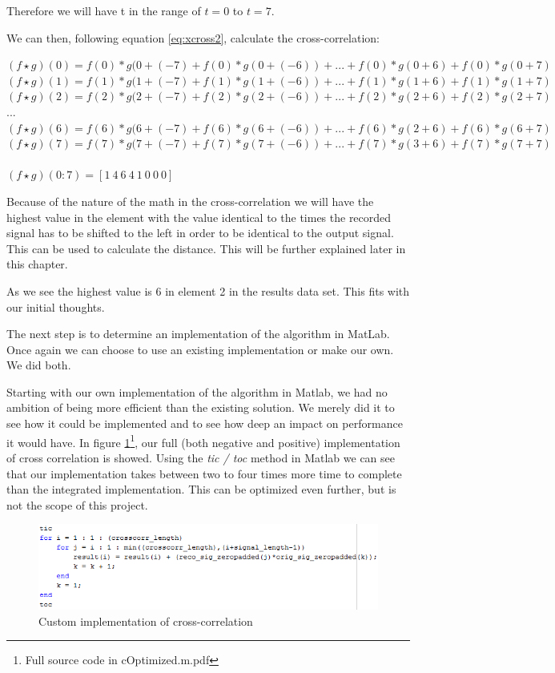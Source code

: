 Therefore we will have t in the range of $t=0$ to $t=7$. 

We can then, following equation \ref{eq:xcross2}, calculate the cross-correlation:

\begin{center}
$(f\star g)(0)=f(0)*g(0+(-7)+f(0)*g(0+(-6))+...+f(0)*g(0+6)+f(0)*g(0+7)$\\
$(f\star g)(1)=f(1)*g(1+(-7)+f(1)*g(1+(-6))+...+f(1)*g(1+6)+f(1)*g(1+7)$\\
$(f\star g)(2)=f(2)*g(2+(-7)+f(2)*g(2+(-6))+...+f(2)*g(2+6)+f(2)*g(2+7)$\\
$...$\\
$(f\star g)(6)=f(6)*g(6+(-7)+f(6)*g(6+(-6))+...+f(6)*g(2+6)+f(6)*g(6+7)$\\
$(f\star g)(7)=f(7)*g(7+(-7)+f(7)*g(7+(-6))+...+f(7)*g(3+6)+f(7)*g(7+7)$\\
\ \\
$(f\star g)(0:7)=[1\ 4\ 6\ 4\ 1\ 0\ 0\ 0]$\\
\end{center}

Because of the nature of the math in the cross-correlation we will have the highest value in the element with the value identical to the times the recorded signal has to be shifted to the left in order to be identical to the output signal. This can be used to calculate the distance. This will be further explained later in this chapter.

As we see the highest value is 6 in element 2 in the results data set. This fits with our initial thoughts.

The next step is to determine an implementation of the algorithm in MatLab. Once again we can choose to use an existing implementation or make our own. We did both.

Starting with our own implementation of the algorithm in Matlab, we had no ambition of being more efficient than the existing solution. We merely did it to see how it could be implemented and to see how deep an impact on performance it would have. 
In figure \ref{fig:ownImp}\footnote{Full source code in cOptimized.m.pdf}, our full (both negative and positive) implementation of cross correlation is showed. Using the \textit{tic / toc} method in Matlab we can see that our implementation takes between two to four times more time to complete than the integrated implementation. This can be optimized even further, but is not the scope of this project. 

\begin{figure}[H]
\centering
\includegraphics[scale=0.9]{billeder/ownImp.png}
\caption{Custom implementation of cross-correlation}
\label{fig:ownImp}
\end{figure} 

